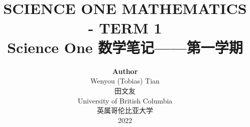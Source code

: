 
\title{ \normalsize \textsc{}
		\\ [2.0cm]
		\HRule{1.5pt} \\
		\LARGE \textbf{\uppercase{Science One Mathematics - Term 1}
		\HRule{2.0pt} \\ [0.6cm] \LARGE{Science One 数学笔记——第一学期} \vspace*{10\baselineskip}}
		}
\date{}
\author{\textbf{Author} \\ 
		Wenyou (Tobias) Tian \\ 田文友 \\
		University of British Columbia \\ 英属哥伦比亚大学 \\
		2022}

\maketitle
\newpage

\tableofcontents
\newpage
